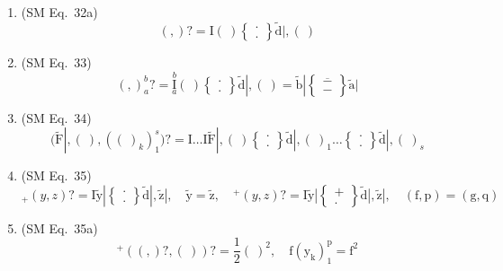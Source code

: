 \documentclass[12pt]{article}
\begin{document}
\begin{enumerate}[label=(\arabic*), series=formellist]
    \item (SM Eq.\ 32a) 
    \[
    ( , )? = \mathrm{I}(\ ) \left\{ \begin{smallmatrix} \cdot \\ . \end{smallmatrix} \right\} \tilde{\mathrm{d}}|, (\ )
    \]

    \item (SM Eq.\ 33) 
    \[
    ( , )_a^b? = \overset{b}{\underset{a}{\mathrm{I}}} (\ ) \left\{ \begin{smallmatrix} \cdot \\ . \end{smallmatrix} \right\} \tilde{\mathrm{d}}|, (\ ) = \tilde{\mathrm{b}}| \left\{ \begin{smallmatrix} \overline{-} \\ - \end{smallmatrix} \right\} \tilde{\mathrm{a}}|
    \]

    \item (SM Eq.\ 34) 
    \[
    (\tilde{\mathrm{F}}|, (\ ), ( (\ )_k )_1^s)? = \mathrm{I} \dots \mathrm{I} \tilde{\mathrm{F}}|, (\ ) \left\{ \begin{smallmatrix} \cdot \\ . \end{smallmatrix} \right\} \tilde{\mathrm{d}}|, (\ )_1 \dots \left\{ \begin{smallmatrix} \cdot \\ . \end{smallmatrix} \right\} \tilde{\mathrm{d}}|, (\ )_s
    \]

    \item (SM Eq.\ 35) 
    \[
    {}_+(y,z)? = \mathrm{I} \tilde{\mathrm{y}}| \left\{ \begin{smallmatrix} \cdot \\ . \end{smallmatrix} \right\} \tilde{\mathrm{d}}|, \tilde{\mathrm{z}}|, \quad \tilde{\mathrm{y}} = \tilde{\mathrm{z}}, \quad {}^+(y,z)? = \mathrm{I} \tilde{\mathrm{y}}| \left\{ \begin{smallmatrix} + \\ . \end{smallmatrix} \right\} \tilde{\mathrm{d}}|, \tilde{\mathrm{z}}|, \quad (\mathrm{f}, \mathrm{p}) = (\mathrm{g}, \mathrm{q})
    \]

    \item (SM Eq.\ 35a) 
    \[
    {}^+( ( , )?, (\ ) )? = \frac{1}{2}(\ )^2, \quad \mathrm{f}(\mathrm{y_k})_1^\mathrm{p} = \mathrm{f}^2
    \]


\end{enumerate}
\end{document}
